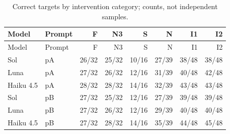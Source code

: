 \begingroup\small\setlength{\tabcolsep}{4pt}
\begin{longtable}{llrrrrrr}
\caption{Correct targets by intervention category; counts, not independent samples.}\\
\toprule
Model & Prompt & F & N3 & S & N & I1 & I2 \\
\midrule\endfirsthead
\toprule
Model & Prompt & F & N3 & S & N & I1 & I2 \\
\midrule\endhead
\bottomrule\endfoot
Sol & pA & 26/32 & 25/32 & 10/16 & 27/39 & 38/48 & 38/48 \\
Luna & pA & 27/32 & 26/32 & 12/16 & 31/39 & 40/48 & 42/48 \\
Haiku 4.5 & pA & 28/32 & 28/32 & 14/16 & 32/39 & 43/48 & 43/48 \\
Sol & pB & 27/32 & 25/32 & 12/16 & 27/39 & 39/48 & 39/48 \\
Luna & pB & 27/32 & 26/32 & 12/16 & 29/39 & 40/48 & 40/48 \\
Haiku 4.5 & pB & 27/32 & 28/32 & 14/16 & 35/39 & 44/48 & 45/48 \\
\end{longtable}\endgroup


